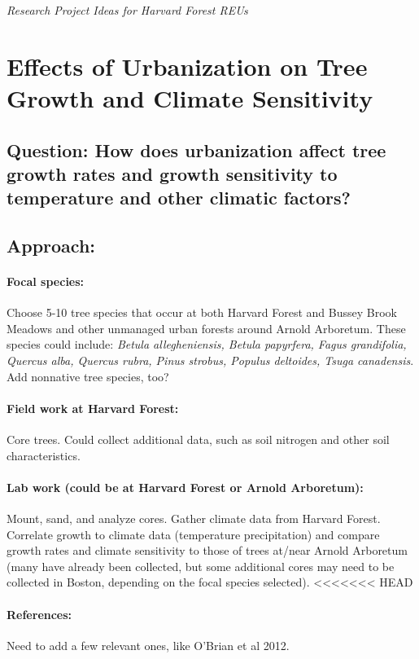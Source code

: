 \documentclass[11pt]{article}
\begin{document}
\noindent \emph{\LARGE Research Project Ideas for Harvard Forest REUs}

\section{Effects of Urbanization on Tree Growth and Climate Sensitivity}
\subsection{Question: How does urbanization affect tree growth rates and growth sensitivity to temperature and other climatic factors?}
\subsection{Approach:}
\paragraph {Focal species:} Choose 5-10 tree species that occur at both Harvard Forest and Bussey Brook Meadows and other unmanaged urban forests around Arnold Arboretum. These species could include: \emph{Betula allegheniensis, Betula papyrfera, Fagus grandifolia, Quercus alba, Quercus rubra, Pinus strobus, Populus deltoides, Tsuga canadensis}. Add nonnative tree species, too?
\paragraph {Field work at Harvard Forest:} Core trees. Could collect additional data, such as soil nitrogen and other soil characteristics. 
\paragraph {Lab work (could be at Harvard Forest or Arnold Arboretum):} Mount, sand, and analyze cores. Gather climate data from Harvard Forest. Correlate growth to climate data (temperature precipitation) and compare growth rates and climate sensitivity to those of trees at/near Arnold Arboretum (many have already been collected, but some additional cores may need to be collected in 
Boston, depending on the focal species selected).
<<<<<<< HEAD
\paragraph {References:} Need to add a few relevant ones, like O'Brian et al 2012.

\section{}
\subsection{}
\paragraph {}

\end{document}
